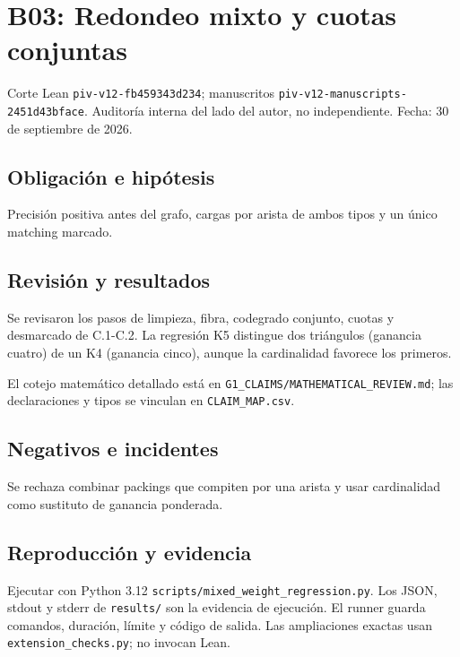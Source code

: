 \documentclass[11pt]{article}
\begin{document}
\section{B03: Redondeo mixto y cuotas
conjuntas}\label{b03-redondeo-mixto-y-cuotas-conjuntas}

Corte Lean \nolinkurl{piv-v12-fb459343d234}; manuscritos
\nolinkurl{piv-v12-manuscripts-2451d43bface}. Auditoría interna del lado
del autor, no independiente. Fecha: 30 de septiembre de 2026.

\subsection{Obligación e hipótesis}\label{obligaciuxf3n-e-hipuxf3tesis}

Precisión positiva antes del grafo, cargas por arista de ambos tipos y
un único matching marcado.

\subsection{Revisión y resultados}\label{revisiuxf3n-y-resultados}

Se revisaron los pasos de limpieza, fibra, codegrado conjunto, cuotas y
desmarcado de C.1-C.2. La regresión K5 distingue dos triángulos
(ganancia cuatro) de un K4 (ganancia cinco), aunque la cardinalidad
favorece los primeros.

El cotejo matemático detallado está en
\nolinkurl{G1_CLAIMS/MATHEMATICAL_REVIEW.md}; las declaraciones y tipos
se vinculan en \nolinkurl{CLAIM_MAP.csv}.

\subsection{Negativos e incidentes}\label{negativos-e-incidentes}

Se rechaza combinar packings que compiten por una arista y usar
cardinalidad como sustituto de ganancia ponderada.

\subsection{Reproducción y evidencia}\label{reproducciuxf3n-y-evidencia}

Ejecutar con Python 3.12 \nolinkurl{scripts/mixed_weight_regression.py}.
Los JSON, stdout y stderr de \nolinkurl{results/} son la evidencia de
ejecución. El runner guarda comandos, duración, límite y código de
salida. Las ampliaciones exactas usan \nolinkurl{extension_checks.py}; no
invocan Lean.
\end{document}
